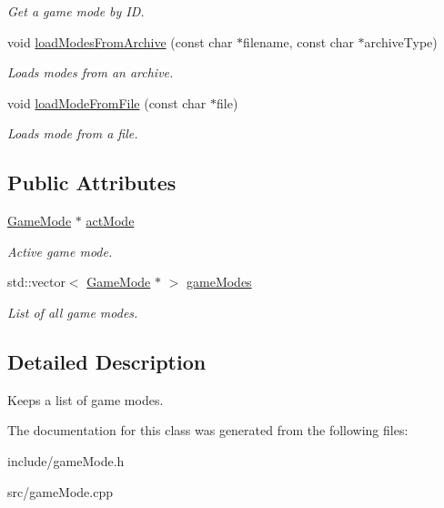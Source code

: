 \begin{DoxyCompactItemize}
\begin{DoxyCompactList}\small\item\em \-Get a game mode by \-I\-D. \end{DoxyCompactList}\item 
\hypertarget{classGameModeManager_a57df15eda971152c88c5765ac024b465}{
void \hyperlink{classGameModeManager_a57df15eda971152c88c5765ac024b465}{load\-Modes\-From\-Archive} (const char $\ast$filename, const char $\ast$archive\-Type)}
\label{d0/dab/classGameModeManager_a57df15eda971152c88c5765ac024b465}

\begin{DoxyCompactList}\small\item\em \-Loads modes from an archive. \end{DoxyCompactList}\item 
\hypertarget{classGameModeManager_a19724c5aabb5e6fbcf6b5c07984338c0}{
void \hyperlink{classGameModeManager_a19724c5aabb5e6fbcf6b5c07984338c0}{load\-Mode\-From\-File} (const char $\ast$file)}
\label{d0/dab/classGameModeManager_a19724c5aabb5e6fbcf6b5c07984338c0}

\begin{DoxyCompactList}\small\item\em \-Loads mode from a file. \end{DoxyCompactList}\end{DoxyCompactItemize}
\subsection*{\-Public \-Attributes}
\begin{DoxyCompactItemize}
\item 
\hypertarget{classGameModeManager_a6458a0878b4c1eb17930d68859cedbe0}{
\hyperlink{classGameMode}{\-Game\-Mode} $\ast$ \hyperlink{classGameModeManager_a6458a0878b4c1eb17930d68859cedbe0}{act\-Mode}}
\label{d0/dab/classGameModeManager_a6458a0878b4c1eb17930d68859cedbe0}

\begin{DoxyCompactList}\small\item\em \-Active game mode. \end{DoxyCompactList}\item 
\hypertarget{classGameModeManager_a1c6c832504a45b6c0b5964958c173210}{
std\-::vector$<$ \hyperlink{classGameMode}{\-Game\-Mode} $\ast$ $>$ \hyperlink{classGameModeManager_a1c6c832504a45b6c0b5964958c173210}{game\-Modes}}
\label{d0/dab/classGameModeManager_a1c6c832504a45b6c0b5964958c173210}

\begin{DoxyCompactList}\small\item\em \-List of all game modes. \end{DoxyCompactList}\end{DoxyCompactItemize}


\subsection{\-Detailed \-Description}
\-Keeps a list of game modes. 

\-The documentation for this class was generated from the following files\-:\begin{DoxyCompactItemize}
\item 
include/game\-Mode.\-h\item 
src/game\-Mode.\-cpp\end{DoxyCompactItemize}
